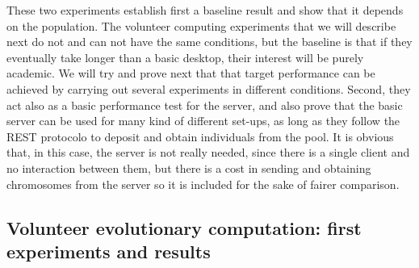 \documentclass[journal,onecolumn]{IEEEtran}
\begin{document}
These two experiments establish first a baseline result and show that
it depends on the population. The volunteer computing experiments that we
will describe next do not and can not have the same conditions, but
the baseline is that if they eventually take longer than a basic
desktop, their interest will be purely academic. We will try and
prove next that that target performance can be achieved by carrying
out several experiments in different conditions. Second, they act also
as a basic performance test for the server, and also prove that the
basic server can be used for many kind of different set-ups, as long
as they follow the REST protocolo to deposit and obtain individuals
from the pool. It is obvious that, in this case, the server is not
really needed, since there is a single client and no interaction
between them, but there is a cost in sending and obtaining chromosomes
from the server so it is included for the sake of fairer comparison. 

\subsection{Volunteer evolutionary computation: first experiments and results}
\end{document}

